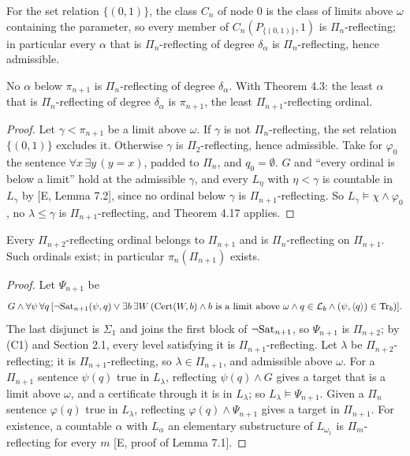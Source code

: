 \documentclass[11pt]{article}
\begin{document}
For the set relation $\{(0,1)\}$, the class $C_n$ of node 0 is the class of limits above $\omega$ containing the
parameter, so every member of $C_n(P_{\{(0,1)\}}, 1)$ is $\Pi_n$-reflecting; in particular every $\alpha$ that is
$\Pi_n$-reflecting of degree $\delta_\alpha$ is $\Pi_n$-reflecting, hence admissible.

\begin{statement} No $\alpha$ below $\pi_{n+1}$ is $\Pi_n$-reflecting of
degree $\delta_\alpha$. With Theorem 4.3: the least $\alpha$ that is $\Pi_n$-reflecting of degree $\delta_\alpha$ is
$\pi_{n+1}$, the least $\Pi_{n+1}$-reflecting ordinal.
\end{statement}

\begin{proof}
Let $\gamma < \pi_{n+1}$ be a limit above $\omega$. If $\gamma$ is not $\Pi_n$-reflecting, the set relation $\{(0,1)\}$
excludes it. Otherwise $\gamma$ is $\Pi_2$-reflecting, hence admissible. Take for $\varphi_0$ the sentence $\forall x\,
\exists y\, (y = x)$, padded to $\Pi_n$, and $q_0 = \emptyset$. $G$ and ``every ordinal is below a limit'' hold at the
admissible $\gamma$, and every $L_\eta$ with $\eta < \gamma$ is countable in $L_\gamma$ by [E, Lemma 7.2], since no
ordinal below $\gamma$ is $\Pi_{n+1}$-reflecting. So $L_\gamma \models \chi \wedge \varphi_0$, no $\lambda \le \gamma$ is
$\Pi_{n+1}$-reflecting, and Theorem 4.17 applies.
\end{proof}

\begin{statement} Every $\Pi_{n+2}$-reflecting ordinal belongs to $\Pi_{n+1}$ and is $\Pi_n$-reflecting on
$\Pi_{n+1}$. Such ordinals exist; in particular $\pi_n(\Pi_{n+1})$ exists.
\end{statement}

\begin{proof}
Let $\Psi_{n+1}$ be
\[ G \wedge \forall\psi\, \forall q\, [\neg\mathrm{Sat}_{n+1}(\psi,q) \vee \exists b\, \exists W\,
(\mathrm{Cert}(W,b) \wedge b \text{ is a limit above } \omega \wedge q \in \mathcal{L}_b \wedge (\psi, \langle q\rangle) \in \mathrm{Tr}_b)]. \]
The last disjunct is $\Sigma_1$ and joins the first block of $\neg\mathrm{Sat}_{n+1}$, so $\Psi_{n+1}$ is $\Pi_{n+2}$; by (C1)
and Section 2.1, every level satisfying it is $\Pi_{n+1}$-reflecting. Let $\lambda$ be $\Pi_{n+2}$-reflecting; it is
$\Pi_{n+1}$-reflecting, so $\lambda \in \Pi_{n+1}$, and admissible above $\omega$. For a $\Pi_{n+1}$ sentence $\psi(q)$ true
in $L_\lambda$, reflecting $\psi(q) \wedge G$ gives a target that is a limit above $\omega$, and a certificate through it
is in $L_\lambda$; so $L_\lambda \models \Psi_{n+1}$. Given a
$\Pi_n$ sentence $\varphi(q)$ true in $L_\lambda$, reflecting $\varphi(q) \wedge \Psi_{n+1}$ gives a target in $\Pi_{n+1}$.
For existence, a countable $\alpha$ with $L_\alpha$ an elementary substructure of $L_{\omega_1}$ is $\Pi_m$-reflecting
for every $m$ [E, proof of Lemma 7.1].
\end{proof}
\end{document}
